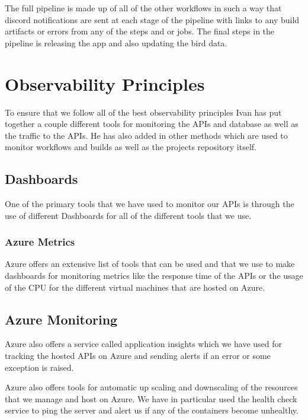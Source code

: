 \documentclass[a4paper]{article}
\begin{document}
The full pipeline is made up of all of the other workflows in such a way that discord notifications 
are sent at each stage of the pipeline with links to any build artifacts or errors from any of 
the steps and or jobs. The final steps in the pipeline is releasing the app and also updating the 
bird data.

\newpage
\section{Observability Principles}

To ensure that we follow all of the best observability principles Ivan has put together a 
couple different tools for monitoring the APIs and database as well as the traffic 
to the APIs. He has also added in other methods which are used to monitor workflows and 
builds as well as the projects repository itself.

\subsection{Dashboards}

One of the primary tools that we have used to monitor our APIs is through the use of 
different Dashboards for all of the different tools that we use. 

\subsubsection{Azure Metrics}

Azure offers an extensive list of tools that can be used and that we use to make dashboards for 
monitoring metrics like the response time of the APIs or the usage of the CPU for the 
different virtual machines that are hosted on Azure. 

\subsection{Azure Monitoring}

Azure also offers a service called application insights which we have used for tracking the hosted APIs on Azure and sending alerts if an error or some exception is raised. 
\newline \newline

Azure also offers tools for automatic up scaling and downscaling of the resources that we manage 
and host on Azure. We have in particular used the health check service to ping the server and 
alert us if any of the containers become unhealthy.
\end{document}
